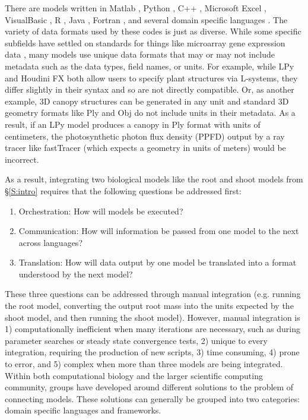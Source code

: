 \documentclass[journal]{IEEEtran}
\begin{document}
There are models written in Matlab \citep{ZHU2013, Wang2014}, Python \citep{Pradal2009}, C++ \citep{Merks2011, Postma2017}, Microsoft Excel \citep{Sharkey2016}, VisualBasic \citep{Humphries1995, HALL2013}, R \citep{WANG2015}, Java \citep{Song2013, Kappas2013}, Fortran \citep{Goudriaan1994}, and several domain specific languages \citep[e.g. SBML,][]{Hucka2003}. The variety of data formats used by these codes is just as diverse. While some specific subfields have settled on standards for things like microarray gene expression data \citep[e.g. MINiML,][]{GEO2017}, many models use unique data formats that may or may not include metadata such as the data types, field names, or units. 
For example, while LPy \citep{Boudon2012} and Houdini FX \citep{HoudiniFX} both allow users to specify plant structures via L-systems, they differ slightly in their syntax and so are not directly compatible. Or, as another example, 3D canopy structures can be generated in any unit and standard 3D geometry formats like Ply \citep{ply} and Obj \citep{obj} do not include units in their metadata. As a result, if an LPy model produces a canopy in Ply format with units of centimeters, the photosynthetic photon flux density (PPFD) output by a ray tracer like fastTracer \citep{Song2013} (which expects a geometry in units of meters) would be incorrect. 

As a result, integrating two biological models like the root and shoot models from \S\ref{S:intro} requires that the following questions be addressed first:
%
\begin{enumerate}
	\item Orchestration: How will models be executed?
	\item Communication: How will information be passed from one model to the next across languages?
	\item Translation: How will data output by one model be translated into a format understood by the next model?
\end{enumerate}

These three questions can be addressed through manual integration (e.g. running the root model, converting the output root mass into the units expected by the shoot model, and then running the shoot model). However, manual integration is 1) computationally inefficient when many iterations are necessary, such as during parameter searches or steady state convergence tests, 2) unique to every integration, requiring the production of new scripts, 3) time consuming, 4) prone to error, and 5) complex when more than three models are being integrated. Within both computational biology and the larger scientific computing community, groups have developed around different solutions to the problem of connecting models. These solutions can generally be grouped into two categories: domain specific languages and frameworks.
\end{document}
